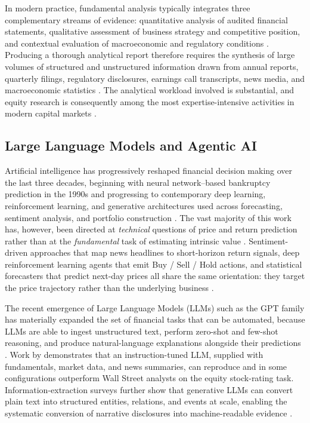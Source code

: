 In modern practice, fundamental analysis typically integrates three complementary streams of evidence: quantitative analysis of audited financial statements, qualitative assessment of business strategy and competitive position, and contextual evaluation of macroeconomic and regulatory conditions \citep{Fatouros2025MarketSense,Papasotiriou2024}. Producing a thorough analytical report therefore requires the synthesis of large volumes of structured and unstructured information drawn from annual reports, quarterly filings, regulatory disclosures, earnings call transcripts, news media, and macroeconomic statistics \citep{Cernevicene2024}. The analytical workload involved is substantial, and equity research is consequently among the most expertise-intensive activities in modern capital markets \citep{Papasotiriou2024}.

\subsection{Large Language Models and Agentic AI}
\label{subsec:tech}

Artificial intelligence has progressively reshaped financial decision making over the last three decades, beginning with neural network--based bankruptcy prediction in the 1990s and progressing to contemporary deep learning, reinforcement learning, and generative architectures used across forecasting, sentiment analysis, and portfolio construction \citep{Tripathi2025}. The vast majority of this work has, however, been directed at \emph{technical} questions of price and return prediction rather than at the \emph{fundamental} task of estimating intrinsic value \citep{Tripathi2025,Cernevicene2024}. Sentiment-driven approaches that map news headlines to short-horizon return signals, deep reinforcement learning agents that emit Buy / Sell / Hold actions, and statistical forecasters that predict next-day prices all share the same orientation: they target the price trajectory rather than the underlying business \citep{Li2026FINSABER}.

The recent emergence of Large Language Models (LLMs) such as the GPT family has materially expanded the set of financial tasks that can be automated, because LLMs are able to ingest unstructured text, perform zero-shot and few-shot reasoning, and produce natural-language explanations alongside their predictions \citep{Xu2024IE,Papasotiriou2024}. Work by \citet{Papasotiriou2024} demonstrates that an instruction-tuned LLM, supplied with fundamentals, market data, and news summaries, can reproduce and in some configurations outperform Wall Street analysts on the equity stock-rating task. Information-extraction surveys further show that generative LLMs can convert plain text into structured entities, relations, and events at scale, enabling the systematic conversion of narrative disclosures into machine-readable evidence \citep{Xu2024IE}.

